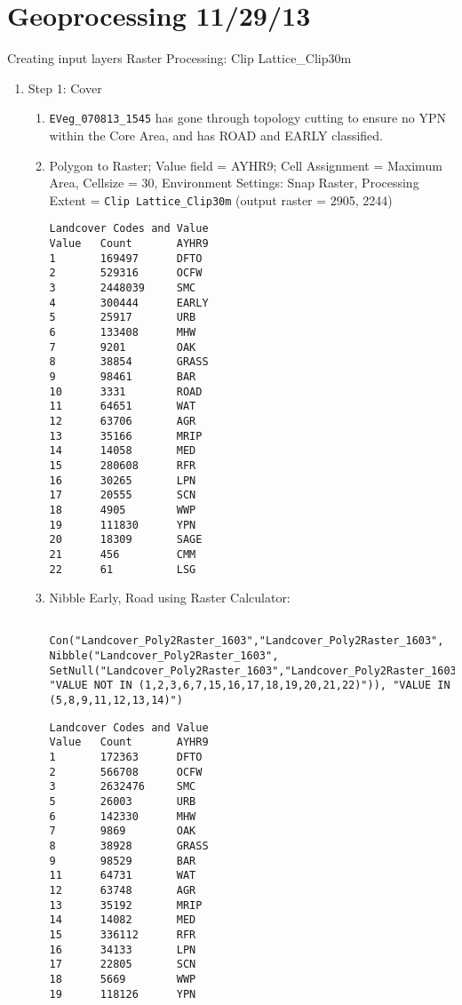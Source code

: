 \section{Geoprocessing 11/29/13}
Creating input layers
Raster Processing: Clip Lattice\_Clip30m
\begin{enumerate}
\item Step 1: Cover
    \begin{enumerate}
    \item \lstinline{EVeg_070813_1545} has gone through topology cutting to ensure no YPN within the Core Area, and has ROAD and EARLY classified. 
    \item Polygon to Raster; Value field = AYHR9; Cell Assignment = Maximum Area, Cellsize = 30, Environment Settings: Snap Raster, Processing Extent = \lstinline{Clip Lattice_Clip30m} (output raster = 2905, 2244)
    \begin{verbatim} 
Landcover Codes and Value
Value   Count       AYHR9
1       169497      DFTO
2       529316      OCFW
3       2448039     SMC
4       300444      EARLY
5       25917       URB
6       133408      MHW
7       9201        OAK
8       38854       GRASS
9       98461       BAR
10      3331        ROAD
11      64651       WAT
12      63706       AGR
13      35166       MRIP
14      14058       MED
15      280608      RFR
16      30265       LPN
17      20555       SCN
18      4905        WWP
19      111830      YPN
20      18309       SAGE
21      456         CMM
22      61          LSG
    \end{verbatim}
    \item Nibble Early, Road using Raster Calculator: \lstset{language=SQL}
    \begin{lstlisting}
    Con("Landcover_Poly2Raster_1603","Landcover_Poly2Raster_1603", Nibble("Landcover_Poly2Raster_1603", SetNull("Landcover_Poly2Raster_1603","Landcover_Poly2Raster_1603", "VALUE NOT IN (1,2,3,6,7,15,16,17,18,19,20,21,22)")), "VALUE IN (5,8,9,11,12,13,14)") 
    \end{lstlisting}
    \begin{verbatim} 
Landcover Codes and Value
Value   Count       AYHR9
1       172363      DFTO
2       566708      OCFW
3       2632476     SMC
5       26003       URB
6       142330      MHW
7       9869        OAK
8       38928       GRASS
9       98529       BAR
11      64731       WAT
12      63748       AGR
13      35192       MRIP
14      14082       MED
15      336112      RFR
16      34133       LPN
17      22805       SCN
18      5669        WWP
19      118126      YPN

\end{verbatim}
\end{enumerate}
\end{enumerate}
